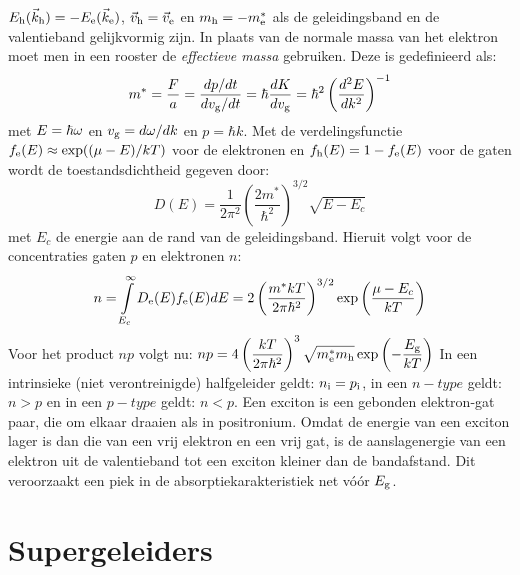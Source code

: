 $E_{\rm h}(\vec{k}_{\rm h})=-E_{\rm e}(\vec{k}_{\rm e})$,
$\vec{v}_{\rm h}=\vec{v}_{\rm e}$ en $m_{\rm h}=-m_{\rm e}^*$ als de geleidingsband
en de valentieband gelijkvormig zijn.
\npar
In plaats van de normale massa van het elektron moet men in een rooster de
{\em effectieve massa} gebruiken. Deze is gedefinieerd als:
\[
m^*=\frac{F}{a}=\frac{dp/dt}{dv_{\rm g}/dt}=\hbar\frac{dK}{dv_{\rm g}}=
\hbar^2\left(\frac{d^2E}{dk^2}\right)^{-1}
\]
met $E=\hbar\omega$ en $v_{\rm g}=d\omega/dk$ en $p=\hbar k$.
\npar
Met de verdelingsfunctie $f_{\rm e}(E)\approx\exp((\mu-E)/kT)$ voor de
elektronen en $f_{\rm h}(E)=1-f_{\rm e}(E)$ voor de gaten wordt de
toestandsdichtheid gegeven door:
\[
D(E)=\frac{1}{2\pi^2}\left(\frac{2m^*}{\hbar^2}\right)^{3/2}\sqrt{E-E_c}
\]
met $E_c$ de energie aan de rand van de geleidingsband. Hieruit volgt voor de
concentraties gaten $p$ en elektronen $n$:
\[
n=\int\limits_{E_c}^{\infty}D_{\rm e}(E)f_{\rm e}(E)dE=2\left(\frac{m^*kT}{2\pi\hbar^2}
\right)^{3/2}\exp\left(\frac{\mu-E_c}{kT}\right)
\]
Voor het product $np$ volgt nu:
$\displaystyle np=4\left(\frac{kT}{2\pi\hbar^2}\right)^3
\sqrt{m^*_{\rm e}m_{\rm h}}\exp\left(-\frac{E_{\rm g}}{kT}\right)$
\npar
In een intrinsieke (niet verontreinigde) halfgeleider geldt: $n_{\rm i}=
p_{\rm i}$, in een $n-type$ geldt: $n>p$ en in een $p-type$ geldt: $n<p$.
\npar
Een exciton is een gebonden elektron-gat paar, die om elkaar draaien als in
positronium. Omdat de energie van een exciton lager is dan die van een
vrij elektron en een vrij gat, is de aanslagenergie van een elektron uit de
valentieband tot een exciton kleiner dan de bandafstand. Dit veroorzaakt een
piek in de absorptiekarakteristiek net v\'o\'or $E_{\rm g}$.

\section{Supergeleiders}

